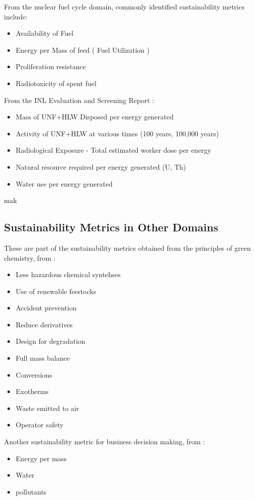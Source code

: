 \documentclass{article}
\begin{document}
From the nuclear fuel cycle domain, commonly identified sustainability
metrics include:
\begin{itemize}
    \item Availability of Fuel
    \item Energy per Mass of feed ( Fuel Utilization )
    \item Proliferation resistance
    \item Radiotoxicity of spent fuel
\end{itemize}


From the \gls{INL} Evaluation and Screening Report \cite{wigeland_nuclear_2014}:
\begin{itemize}
    \item Mass of UNF+HLW Disposed per energy generated
    \item Activity of UNF+HLW at various times (100 years, 100,000 years)
    \item Radiological Exposure - Total estimated worker dose per energy
    \item Natural resource required per energy generated (U, Th)
    \item Water use per energy generated
\end{itemize}
mak

\subsection{Sustainability Metrics in Other Domains}

These are part of the sustainability metrics obtained from the principles
of green chemistry, from \cite{gonzalez_methodology_2003}:
\begin{itemize}
    \item Less hazardous chemical syntehses
    \item Use of renewable feestocks
    \item Accident prevention
    \item Reduce derivatives
    \item Design for degradation
    \item Full mass balance
    \item Conversions
    \item Exotherms
    \item Waste emitted to air
    \item Operator safety
\end{itemize}

Another sustainability metric for business decision making, from \cite{schwarz_use_2002}:
\begin{itemize}
    \item Energy per mass
    \item Water
    \item pollutants
\end{itemize}
\end{document}
